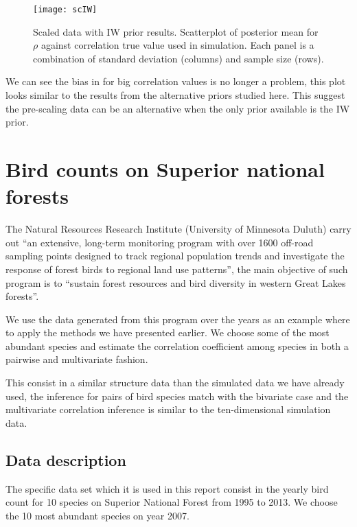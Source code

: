 \documentclass{article}
\begin{document}
\begin{figure}[htbp]
   \centering
   \texttt{[image: scIW]} %
    \vspace{-.5in}
   \caption{Scaled data with IW prior results. Scatterplot of posterior mean for $\rho$  against correlation true value used in simulation. Each panel is a combination of standard deviation (columns) and sample size (rows). \label{sciw} }
\end{figure}

We can see the bias in for big correlation values is no longer a problem, this plot looks similar to the results from the alternative priors studied here. This suggest the pre-scaling data can be an alternative when the only prior available is the IW prior. 


\section{Bird counts on Superior national forests}

The Natural Resources Research Institute (University of Minnesota Duluth) carry out ``an extensive, long-term monitoring program with over 1600 off-road sampling points designed to track regional population trends and investigate the response of forest birds to regional land use patterns'', the main objective of such program is to  ``sustain forest resources and bird diversity in western Great Lakes forests''.

We use the data generated from this program over the years as an example where to apply the methods we have presented earlier. We choose some of the most abundant species and estimate the correlation coefficient among species in both a pairwise and multivariate fashion. 

This consist in a similar structure data than the simulated data we have already used, the inference for pairs of bird species match with the bivariate case and the multivariate correlation inference is similar to the ten-dimensional simulation data. 

\subsection{Data description}
The specific data set which it is used in this report consist in the yearly bird count for 10 species on Superior National Forest from 1995 to 2013.  We choose the 10 most abundant species on year 2007. 
\end{document}

